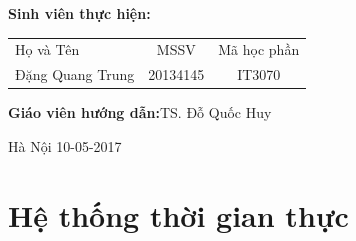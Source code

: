 \documentclass[a4paper,10pt]{report}
\begin{document}
\hspace{1cm}\fontsize{14}{16}\selectfont \textbf{Sinh viên thực hiện: }
\begin{longtable}{l c c }
Họ và Tên & MSSV &    Mã học phần \\[0.5cm]
Đặng Quang Trung &    20134145 & IT3070\\

\end{longtable}
\hspace{0.3cm}\fontsize{14}{16}\selectfont \textbf{Giáo viên hướng dẫn:}TS. Đỗ Quốc Huy \\[1.0cm]
\begin{center}
\fontsize{16}{19}\selectfont Hà Nội 10-05-2017
\end{center} 
\tableofcontents
\chapter{Hệ thống thời gian thực}
\end{document}
